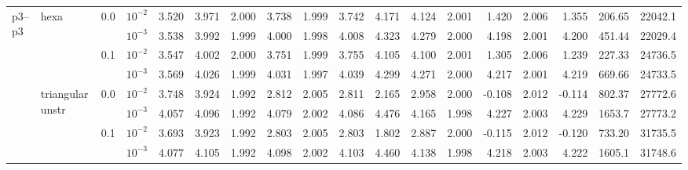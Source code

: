 \begin{longtable}{llclrrrrrrrrrrrrrr}
\multirow{8}{*}{p3--p3} & \multirow{4}{*}{hexa} & \multirow{2}{*}{0.0} & $10^{-2}$ & 3.520 & 3.971 & 2.000 & 3.738 & 1.999 & 3.742 & 4.171 & 4.124 & 2.001 & 1.420 & 2.006 & 1.355 & 206.65 & 22042.1 \\
& & & $10^{-3}$ & 3.538 & 3.992 & 1.999 & 4.000 & 1.998 & 4.008 & 4.323 & 4.279 & 2.000 & 4.198 & 2.001 & 4.200 & 451.44 & 22029.4 \\\cline{3-18}
& & \multirow{2}{*}{0.1} & $10^{-2}$ & 3.547 & 4.002 & 2.000 & 3.751 & 1.999 & 3.755 & 4.105 & 4.100 & 2.001 & 1.305 & 2.006 & 1.239 & 227.33 & 24736.5 \\
& & & $10^{-3}$ & 3.569 & 4.026 & 1.999 & 4.031 & 1.997 & 4.039 & 4.299 & 4.271 & 2.000 & 4.217 & 2.001 & 4.219 & 669.66 & 24733.5 \\\cline{2-18}
& \multirow{4}{*}{triangular unstr} & \multirow{2}{*}{0.0} & $10^{-2}$ & 3.748 & 3.924 & 1.992 & 2.812 & 2.005 & 2.811 & 2.165 & 2.958 & 2.000 & -0.108 & 2.012 & -0.114 & 802.37 & 27772.6 \\
& & & $10^{-3}$ & 4.057 & 4.096 & 1.992 & 4.079 & 2.002 & 4.086 & 4.476 & 4.165 & 1.998 & 4.227 & 2.003 & 4.229 & 1653.7 & 27773.2 \\\cline{3-18}
& & \multirow{2}{*}{0.1} & $10^{-2}$ & 3.693 & 3.923 & 1.992 & 2.803 & 2.005 & 2.803 & 1.802 & 2.887 & 2.000 & -0.115 & 2.012 & -0.120 & 733.20 & 31735.5 \\
& & & $10^{-3}$ & 4.077 & 4.105 & 1.992 & 4.098 & 2.002 & 4.103 & 4.460 & 4.138 & 1.998 & 4.218 & 2.003 & 4.222 & 1605.1 & 31748.6 \\\hline

\bottomrule
\end{longtable}
\normalsize
